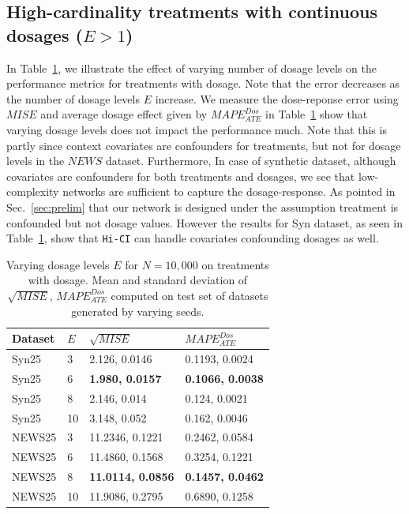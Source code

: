 \documentclass[twoside,11pt]{article}
\begin{document}
\subsection{High-cardinality treatments with continuous dosages ($E>1$)}
In Table~\ref{tab:exp3_varying_e}, we illustrate the effect of varying number of dosage levels on the performance metrics for treatments with dosage. Note that the error decreases as the number of dosage levels $E$ increase. We measure the dose-reponse error using $MISE$ and average dosage effect given by $MAPE_{ATE}^{Dos}$ in Table~\ref{tab:exp3_varying_e} show that varying dosage levels does not impact the performance much. Note that this is partly since context covariates are confounders for treatments, but not for dosage levels in the $NEWS$ dataset. Furthermore, In case of synthetic dataset, although covariates are confounders for both treatments and dosages, we see that low-complexity networks are sufficient to capture the dosage-response. As pointed in Sec.~\ref{sec:prelim} that our network is designed under the assumption treatment is confounded but not dosage values. However the results for \textsf{Syn} dataset, as seen in Table~\ref{tab:exp3_varying_e}, show that \texttt{Hi-CI} can handle covariates confounding dosages as well.
\begin{table}[h]
\centering
\caption{Varying dosage levels $E$ for $N = 10,000$ on treatments with dosage. Mean and standard deviation of $\sqrt{MISE}$, $MAPE_{ATE}^{Dos}$ computed on test set of datasets generated by varying seeds.}
  \label{tab:exp3_varying_e}  
  \begin{tabular}{l|l|l|l}
    \hline
    Dataset & $E$ & $\sqrt{MISE}$ & $MAPE_{ATE}^{Dos}$\\
    \hline
    \textsf{Syn25} & 3 & 2.126, 0.0146 & 0.1193, 0.0024\\
    \textsf{Syn25} & 6 & \textbf{1.980, 0.0157} & \textbf{0.1066, 0.0038}\\
    \textsf{Syn25} & 8 & 2.146, 0.014 & 0.124, 0.0021\\
    \textsf{Syn25} & 10 & 3.148, 0.052 & 0.162, 0.0046\\
    \textsf{NEWS25} & 3 & 11.2346, 0.1221 & 0.2462, 0.0584\\
    \textsf{NEWS25} & 6 & 11.4860, 0.1568 & 0.3254, 0.1221\\
    \textsf{NEWS25} & 8 & \textbf{11.0114, 0.0856} & \textbf{0.1457, 0.0462}\\
    \textsf{NEWS25} & 10 & 11.9086, 0.2795 & 0.6890, 0.1258\\
    \hline
\end{tabular}
\end{table}
\end{document}
